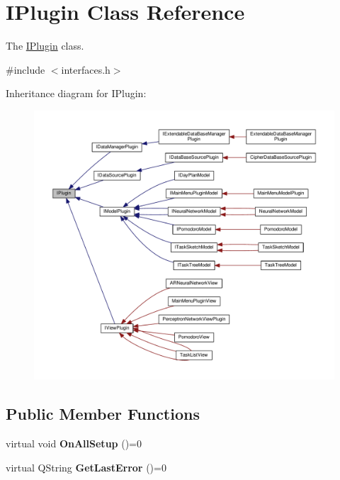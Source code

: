 \hypertarget{class_i_plugin}{}\section{I\+Plugin Class Reference}
\label{class_i_plugin}


The \hyperlink{class_i_plugin}{I\+Plugin} class.  




{\ttfamily \#include $<$interfaces.\+h$>$}



Inheritance diagram for I\+Plugin\+:\nopagebreak
\begin{figure}[H]
\begin{center}
\leavevmode
\includegraphics[width=350pt]{class_i_plugin__inherit__graph}
\end{center}
\end{figure}
\subsection*{Public Member Functions}
\begin{DoxyCompactItemize}
\item 
virtual void {\bfseries On\+All\+Setup} ()=0\hypertarget{class_i_plugin_a6cfbb338c5be95b42079d935aad8f02f}{}\label{class_i_plugin_a6cfbb338c5be95b42079d935aad8f02f}

\item 
virtual Q\+String {\bfseries Get\+Last\+Error} ()=0\hypertarget{class_i_plugin_a47261bd639ed10f898fd4ecfbc74f4a9}{}\label{class_i_plugin_a47261bd639ed10f898fd4ecfbc74f4a9}

\end{DoxyCompactItemize}


